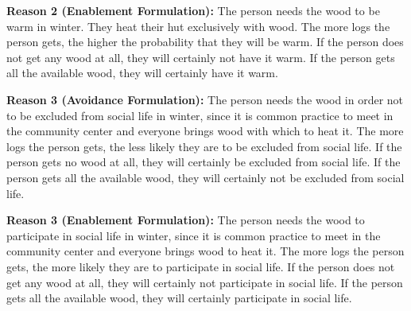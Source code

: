 \documentclass[egregdoesnotlikesansseriftitles]{scrartcl}
\begin{document}
\noindent\textbf{Reason 2 (Enablement Formulation):} The person needs the wood to be warm in winter. %
They heat their hut exclusively with wood. %
The more logs the person gets, the higher the probability that they will be warm. %
If the person does not get any wood at all, they will certainly not have it warm. %
If the person gets all the available wood, they will certainly have it warm.\vspace{2ex} %

\noindent\textbf{Reason 3 (Avoidance Formulation):} The person needs the wood in order not to be excluded from social life in winter, since it is common practice to meet in the community center and everyone brings wood with which to heat it. %
The more logs the person gets, the less likely they are to be excluded from social life. %
If the person gets no wood at all, they will certainly be excluded from social life. %
If the person gets all the available wood, they will certainly not be excluded from social life.\vspace{2ex} %

\noindent\textbf{Reason 3 (Enablement Formulation):} The person needs the wood to participate in social life in winter, since it is common practice to meet in the community center and everyone brings wood to heat it. %
The more logs the person gets, the more likely they are to participate in social life. %
If the person does not get any wood at all, they will certainly not participate in social life. %
If the person gets all the available wood, they will certainly participate in social life.\vspace{2ex} %
\end{document}
